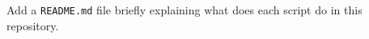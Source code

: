 \question[10]

Add a \texttt{README.md} file briefly explaining what does each script do in this repository.
